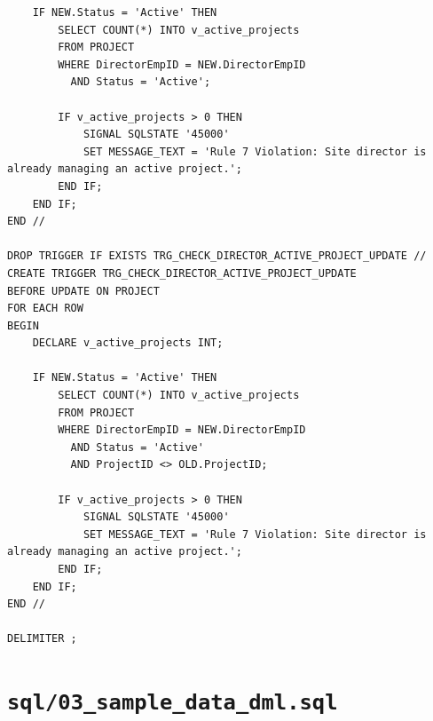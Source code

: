 \documentclass[a4paper,12pt]{report}
\begin{document}
\begin{lstlisting}
    IF NEW.Status = 'Active' THEN
        SELECT COUNT(*) INTO v_active_projects
        FROM PROJECT
        WHERE DirectorEmpID = NEW.DirectorEmpID
          AND Status = 'Active';

        IF v_active_projects > 0 THEN
            SIGNAL SQLSTATE '45000'
            SET MESSAGE_TEXT = 'Rule 7 Violation: Site director is already managing an active project.';
        END IF;
    END IF;
END //

DROP TRIGGER IF EXISTS TRG_CHECK_DIRECTOR_ACTIVE_PROJECT_UPDATE //
CREATE TRIGGER TRG_CHECK_DIRECTOR_ACTIVE_PROJECT_UPDATE
BEFORE UPDATE ON PROJECT
FOR EACH ROW
BEGIN
    DECLARE v_active_projects INT;

    IF NEW.Status = 'Active' THEN
        SELECT COUNT(*) INTO v_active_projects
        FROM PROJECT
        WHERE DirectorEmpID = NEW.DirectorEmpID
          AND Status = 'Active'
          AND ProjectID <> OLD.ProjectID;

        IF v_active_projects > 0 THEN
            SIGNAL SQLSTATE '45000'
            SET MESSAGE_TEXT = 'Rule 7 Violation: Site director is already managing an active project.';
        END IF;
    END IF;
END //

DELIMITER ;
\end{lstlisting}

\section{\texorpdfstring{\texttt{sql/03\_\allowbreak{}sample\_\allowbreak{}data\_\allowbreak{}dml.\allowbreak{}sql}}{sql/03sampledatadml.sql}}\label{a.3-sql03_sample_data_dml.sql}
\end{document}
